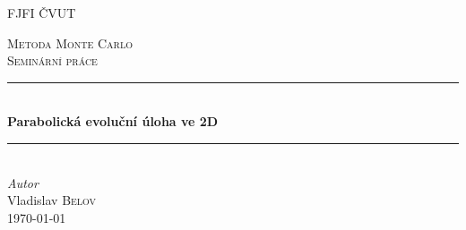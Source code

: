 \documentclass[11pt,american,czech]{article}
\begin{document}
\def\documentdate{...}


\begin{titlepage} %
	\newcommand{\HRule}{\rule{\linewidth}{0.5mm}} %
	\center %
	
	\textsc{\LARGE FJFI ČVUT}\\[1.5cm] %
	\vfill
	
	
	\textsc{\Large Metoda Monte Carlo}\\[0.5cm] %
	\textsc{\large Seminární práce}\\[0.5cm] %
	\HRule\\[0.4cm]
	{\huge\bfseries Parabolická evoluční úloha ve 2D}\\[0.4cm] %
	\HRule\\[1.5cm]
	{\large\textit{Autor}}\\
	Vladislav \textsc{Belov}\\
	\vfill\vfill\vfill\vfill\vfill\vfill\vfill %
	{\large\today} %
	

\end{titlepage}
\end{document}
